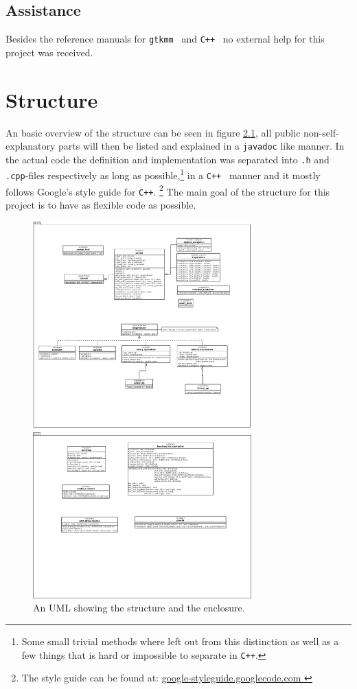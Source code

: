 \documentclass[a4paper,11pt]{kth-mag}
\newcommand{\Cpp}{\texttt{C++}}
\newcommand{\Gtkmm}{\texttt{gtkmm}}
\begin{document}
\section{Assistance}
Besides the reference manuals for \Gtkmm~ and \Cpp~ no external help for 
this project was received.

\chapter{Structure}
An basic overview of the structure can be seen in figure \ref{fig:UML}, all
public non-self-explanatory parts will then be listed and explained in 
a \verb+javadoc+ like manner. In the actual code the definition and
implementation was separated into \texttt{.h} and \texttt{.cpp}-files
respectively as long as possible,\footnote{Some small trivial methods where
left out from this distinction as well as a few things that is hard or
impossible to separate in \Cpp.} in a \Cpp~ manner and it mostly follows Google's
style guide for \Cpp.
\footnote{The style guide can be found at:
\href{
    http://google-styleguide.googlecode.com/svn/trunk/cppguide.xml
    }{
    google-styleguide.googlecode.com
    }
} 
The main goal of the structure for this project is to have as flexible code as possible.
\begin{figure}[ht]
\begin{center}
    \includegraphics[width=0.75\textwidth]{uml.pdf}
    \caption{\small{An UML showing the structure and the enclosure.}}\label{fig:UML}
\end{center}
\end{figure}
\end{document}
